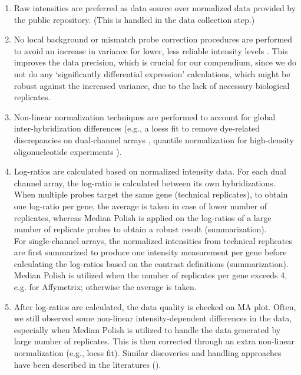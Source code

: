 \begin{enumerate}
\item Raw intensities are preferred as data source over normalized data
  provided by the public repository. (This is handled in the data collection
  step.)
%
\item No local background or mismatch probe correction procedures are
  performed to avoid an increase in variance for lower, less reliable
  intensity levels \cite{Ritchie2007, Irizarry2006, Engelen2006, Li2001}.
  This improves the data precision, which is crucial for our compendium, since
  we do not do any `significantly differential expression' calculations, which
  might be robust against the increased variance, due to the lack of necessary
  biological replicates.
%
\item Non-linear normalization techniques are performed to account for global
  inter-hybridization differences (e.g., a loess fit to remove dye-related
  discrepancies on dual-channel arrays \cite{Yang2002}, quantile normalization
  for high-density oligonucleotide experiments \cite{Bolstad2003}).
%
\item Log-ratios are calculated based on normalized intensity data.
  For each dual channel array, the log-ratio is calculated between its
  own hybridizations.  When multiple probes target the same gene
  (technical replicates), to obtain one log-ratio per gene, the
  average is taken in case of lower number of replicates, whereas
  Median Polish is applied on the log-ratios of a large number of
  replicate probes to obtain a robust result (summarization). \vspace{1.5mm} \\
  For single-channel arrays, the normalized intensities from technical
  replicates are first summarized to produce one intensity measurement
  per gene before calculating the log-ratios based on the contrast
  definitions (summarization).  Median Polish is utilized when the number of
  replicates per gene exceeds 4, e.g. for Affymetrix; otherwise the
  average is taken.
%
\item After log-ratios are calculated, the data quality is checked on MA plot.
  Often, we still observed some non-linear intensity-dependent differences in
  the data, especially when Median Polish is utilized to handle the data
  generated by large number of replicates.  This is then corrected through an
  extra non-linear normalization (e.g., loess fit).  Similar discoveries and
  handling approaches have been described in the literatures (\cite{Choe2005,
    Welsh2013}).
\end{enumerate}


